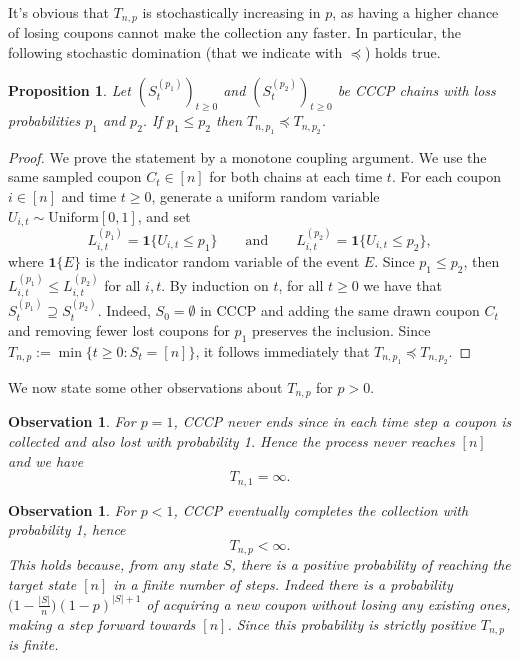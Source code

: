 \documentclass[11pt,a4paper]{article}
\newtheorem{proposition}[theorem]{Proposition}
\newtheorem{observation}[theorem]{Observation}
\begin{document}
It's obvious that $T_{n,p}$ is stochastically increasing in $p$, as having a higher chance of losing coupons cannot make the collection any faster. 
In particular, the following stochastic domination (that we indicate with $\preceq$) holds true.
\begin{proposition}\label{prop: monotone coupling}
Let $(S_t^{(p_1)})_{t \ge 0}$ and $(S_t^{(p_2)})_{t \ge 0}$ be CCCP chains with loss probabilities $p_1$ and $p_2$.
If $p_1 \le p_2$ then $T_{n,p_1} \preceq T_{n,p_2}$.
\end{proposition}
\begin{proof}
We prove the statement by a monotone coupling argument.
% 
We use the same sampled coupon $C_t \in [n]$ for both chains at each time $t$.
For each coupon $i \in [n]$ and time $t \ge 0$, generate a uniform random variable $U_{i,t} \sim \text{Uniform}[0,1]$, and set
\[
	L_{i,t}^{(p_1)} = \mathbf{1}\{ U_{i,t} \le p_1 \}
	\qquad\text{and}\qquad
	L_{i,t}^{(p_2)} = \mathbf{1}\{ U_{i,t} \le p_2 \},
\]
where $\mathbf{1}\{E\}$ is the indicator random variable of the event $E$.
Since $p_1\le p_2$, then $L_{i,t}^{(p_1)} \le L_{i,t}^{(p_2)}$ for all $i,t$.
% 
By induction on $t$, for all $t \ge 0$ we have that $S_t^{(p_1)} \supseteq S_t^{(p_2)}$.
Indeed, $S_0 = \emptyset$ in CCCP and adding the same drawn coupon $C_t$ and removing fewer lost coupons for $p_1$ preserves the inclusion.
% 
Since $T_{n,p} := \min\{ t\ge 0 : S_t = [n] \}$, it follows immediately that $T_{n,p_1} \preceq T_{n,p_2}$.
\end{proof}

We now state some other observations about $T_{n,p}$ for $p>0$. 

\begin{observation}
For $p=1$, CCCP never ends since in each time step a coupon is collected and also lost with probability 1. Hence the process never reaches $[n]$ and we have
\[
    T_{n,1} = \infty.
\]
\end{observation}
\begin{observation}
For $p<1$, CCCP eventually completes the collection with probability 1, hence
\[
    T_{n,p} < \infty.
\]
This holds because, from any state $S$, there is a positive probability of reaching the target state $[n]$ in a finite number of steps.
Indeed there is a probability $\big(1-\frac{|S|}{n}\big)(1-p)^{|S|+1}$ of acquiring a new coupon without losing any existing ones, making a step forward towards $[n]$.
Since this probability is strictly positive $T_{n,p}$ is finite.
\end{observation}
\end{document}
